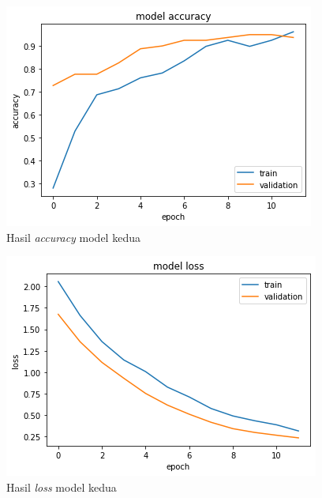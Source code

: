 \begin{figure}[H]
  \centering

  \includegraphics[scale=0.6]{gambar/bab4-uji-model-second-acc.png}

  \caption{Hasil \emph{accuracy} model kedua}
  \label{fig:model2-train-acc}
\end{figure}

\begin{figure}[H]
  \centering

  \includegraphics[scale=0.6]{gambar/bab4-uji-model-second-loss.png}

  \caption{Hasil \emph{loss} model kedua}
  \label{fig:model2-train-loss}
\end{figure}


